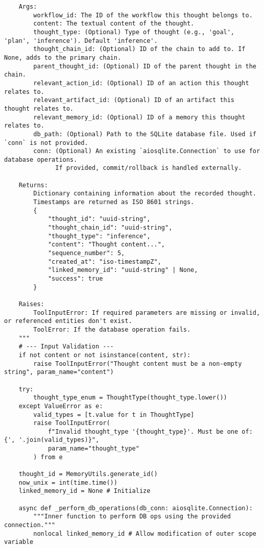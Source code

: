 \documentclass[12pt,a4paper]{article}
\begin{document}
\begin{pageablecode}
\begin{verbatim}
    Args:
        workflow_id: The ID of the workflow this thought belongs to.
        content: The textual content of the thought.
        thought_type: (Optional) Type of thought (e.g., 'goal', 'plan', 'inference'). Default 'inference'.
        thought_chain_id: (Optional) ID of the chain to add to. If None, adds to the primary chain.
        parent_thought_id: (Optional) ID of the parent thought in the chain.
        relevant_action_id: (Optional) ID of an action this thought relates to.
        relevant_artifact_id: (Optional) ID of an artifact this thought relates to.
        relevant_memory_id: (Optional) ID of a memory this thought relates to.
        db_path: (Optional) Path to the SQLite database file. Used if `conn` is not provided.
        conn: (Optional) An existing `aiosqlite.Connection` to use for database operations.
              If provided, commit/rollback is handled externally.

    Returns:
        Dictionary containing information about the recorded thought.
        Timestamps are returned as ISO 8601 strings.
        {
            "thought_id": "uuid-string",
            "thought_chain_id": "uuid-string",
            "thought_type": "inference",
            "content": "Thought content...",
            "sequence_number": 5,
            "created_at": "iso-timestampZ",
            "linked_memory_id": "uuid-string" | None,
            "success": true
        }

    Raises:
        ToolInputError: If required parameters are missing or invalid, or referenced entities don't exist.
        ToolError: If the database operation fails.
    """
    # --- Input Validation ---
    if not content or not isinstance(content, str):
        raise ToolInputError("Thought content must be a non-empty string", param_name="content")

    try:
        thought_type_enum = ThoughtType(thought_type.lower())
    except ValueError as e:
        valid_types = [t.value for t in ThoughtType]
        raise ToolInputError(
            f"Invalid thought_type '{thought_type}'. Must be one of: {', '.join(valid_types)}",
            param_name="thought_type"
        ) from e

    thought_id = MemoryUtils.generate_id()
    now_unix = int(time.time())
    linked_memory_id = None # Initialize

    async def _perform_db_operations(db_conn: aiosqlite.Connection):
        """Inner function to perform DB ops using the provided connection."""
        nonlocal linked_memory_id # Allow modification of outer scope variable


\end{verbatim}
\end{pageablecode}
\end{document}
